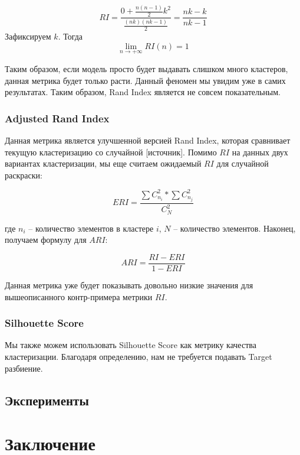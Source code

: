 $$
RI = \frac{0 + \frac{n(n-1)}{2}k^2}{\frac{(nk)(nk - 1)}{2}} = \frac{nk - k}{nk - 1}
$$
\noindent
Зафиксируем $k$. Тогда $$\lim_{n \rightarrow +\infty} RI(n) = 1$$

Таким образом, если модель просто будет выдавать слишком много кластеров, данная метрика будет только расти. Данный феномен мы увидим уже в самих результатах. Таким образом, Rand Index является не совсем показательным.

\subsubsection{Adjusted Rand Index}

Данная метрика является улучшенной версией Rand Index, которая сравнивает текущую кластеризацию со случайной [источник]. Помимо $RI$ на данных двух вариантах кластеризации, мы еще считаем ожидаемый $RI$ для случайной раскраски:

$$
ERI = \frac{\sum C_{n_i}^2 * \sum C_{n_j}^2}{C_N^2}
$$

\noindent где $n_i$ -- количество элементов в кластере $i$, $N$ -- количество элементов. Наконец, получаем формулу для $ARI$:

$$
ARI = \frac{RI - ERI}{1 - ERI}
$$

Данная метрика уже будет показывать довольно низкие значения для вышеописанного контр-примера метрики $RI$. 

\subsubsection{Silhouette Score}

Мы также можем использовать Silhouette Score как метрику качества кластеризации. Благодаря определению, нам не требуется подавать Target разбиение.

\subsection{Эксперименты}

\newpage
\section{Заключение}